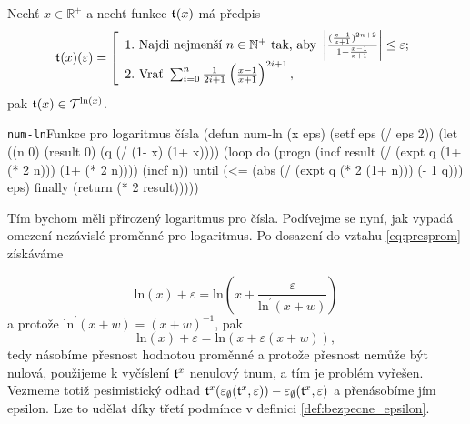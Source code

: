 \begin{fact}
Nechť $x\in\mathbb{R}^+$ a nechť funkce $\mathfrak{t}^{}(x)$ má předpis
\begin{equation}
\mathfrak{t}^{}(x)(\varepsilon)=\left[\begin{array}{l}\mathrm{1.~}\text{Najdi~nejmenší~}n\in\mathbb{N}^+\text{~tak,~aby~}\left|\frac{(\frac{x-1}{x+1})^{2n+2}}{1-\frac{x-1}{x+1}}\right| \leq \varepsilon;\\
\mathrm{2.~}\text{Vrať~}\sum_{i=0}^n \frac{1}{2i+1}\left(\frac{x-1}{x+1}\right)^{2i+1},\end{array}\right.
\end{equation}
pak $\mathfrak{t}^{}(x)\in\mathcal{T}^{\mathrm{ln}(x)}$.
\end{fact}
\begin{lispcode}{\texttt{num-ln}}{Funkce pro logaritmus čísla}
(\textcolor{funkcionalni}{defun} \textcolor{pojmenovan}{num-ln} (x eps)
  (\textcolor{vedlejsi}{setf} eps (\textcolor{matematicke}{/} eps 2))
  (\textcolor{vedlejsi}{let} ((n 0) (result 0) (q (\textcolor{matematicke}{/} (\textcolor{matematicke}{1-} x) (\textcolor{matematicke}{1+} x))))
    (\textcolor{funkcionalni}{loop} 
     \textcolor{obarvi}{do} (\textcolor{funkcionalni}{progn} 
          (\textcolor{vedlejsi}{incf} result
                (\textcolor{matematicke}{/} (\textcolor{matematicke}{expt} q (\textcolor{matematicke}{1+} (\textcolor{matematicke}{*} 2 n))) (\textcolor{matematicke}{1+} (\textcolor{matematicke}{*} 2 n))))
          (\textcolor{vedlejsi}{incf} n))
     \textcolor{obarvi}{until} (\textcolor{matematicke}{<=} (\textcolor{matematicke}{abs} (\textcolor{matematicke}{/} (\textcolor{matematicke}{expt} q (\textcolor{matematicke}{*} 2 (\textcolor{matematicke}{1+} n))) (\textcolor{matematicke}{-} 1 q)))
               eps)
     \textcolor{obarvi}{finally} (\textcolor{funkcionalni}{return} (\textcolor{matematicke}{*} 2 result)))))
\end{lispcode}

Tím bychom měli přirozený logaritmus pro čísla. Podívejme se nyní, jak vypadá omezení nezávislé proměnné pro logaritmus. Po dosazení do vztahu \eqref{eq:presprom} získáváme

\begin{equation}
\mathrm{ln}(x)+\varepsilon=\mathrm{ln}\left(x+\frac{\varepsilon}{\mathrm{ln}^{'}(x+w)}\right)
\end{equation}
a protože $\mathrm{ln}^{'}(x+w)=(x+w)^{-1}$, pak
\begin{equation}
\mathrm{ln}(x)+\varepsilon=\mathrm{ln}(x+\varepsilon(x+w)),
\end{equation}
tedy násobíme přesnost hodnotou proměnné a protože přesnost nemůže být nulová, použijeme k vyčíslení $\mathfrak{t}^{x}$ nenulový tnum, a tím je problém vyřešen. Vezmeme totiž pesimistický odhad $\mathfrak{t}^{x}(\varepsilon_\emptyset(\mathfrak{t}^{x},\varepsilon))-\varepsilon_\emptyset(\mathfrak{t}^{x},\varepsilon)$ a přenásobíme jím epsilon. Lze to udělat díky třetí podmínce v definici \ref{def:bezpecne_epsilon}.

